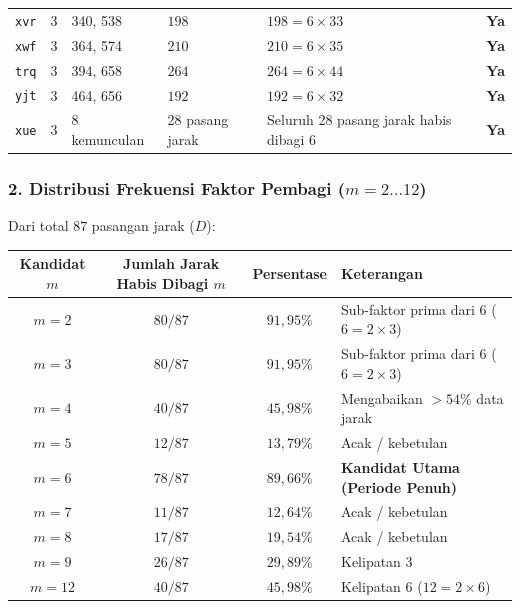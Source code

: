 \documentclass[11pt,a4paper]{article}
\begin{document}
\begin{table}[h!]
{\begin{tabular}{l c l l l c}
\texttt{xvr}   & 3 & 340, 538      & $198$          & $198 = 6 \times 33$                              & \textbf{Ya} \\
\texttt{xwf}   & 3 & 364, 574      & $210$          & $210 = 6 \times 35$                              & \textbf{Ya} \\
\texttt{trq}   & 3 & 394, 658      & $264$          & $264 = 6 \times 44$                              & \textbf{Ya} \\
\texttt{yjt}   & 3 & 464, 656      & $192$          & $192 = 6 \times 32$                              & \textbf{Ya} \\
\texttt{xue}   & 3 & 8 kemunculan  & 28 pasang jarak& Seluruh 28 pasang jarak habis dibagi 6           & \textbf{Ya} \\
\bottomrule
\end{tabular}
}
\end{table}

\subsubsection*{2. Distribusi Frekuensi Faktor Pembagi ($m = 2 \dots 12$)}
Dari total $87$ pasangan jarak ($D$):
\begin{center}
\small
\begin{tabular}{c c c l}
\toprule
\textbf{Kandidat $m$} & \textbf{Jumlah Jarak Habis Dibagi $m$} & \textbf{Persentase} & \textbf{Keterangan} \\
\midrule
$m = 2$  & $80 / 87$ & $91{,}95\%$ & Sub-faktor prima dari 6 ($6 = 2 \times 3$) \\
$m = 3$  & $80 / 87$ & $91{,}95\%$ & Sub-faktor prima dari 6 ($6 = 2 \times 3$) \\
$m = 4$  & $40 / 87$ & $45{,}98\%$ & Mengabaikan $>54\%$ data jarak \\
$m = 5$  & $12 / 87$ & $13{,}79\%$ & Acak / kebetulan \\
\textbf{$m = 6$} & \textbf{$78 / 87$} & \textbf{$89{,}66\%$} & \textbf{Kandidat Utama (Periode Penuh)} \\
$m = 7$  & $11 / 87$ & $12{,}64\%$ & Acak / kebetulan \\
$m = 8$  & $17 / 87$ & $19{,}54\%$ & Acak / kebetulan \\
$m = 9$  & $26 / 87$ & $29{,}89\%$ & Kelipatan 3 \\
$m = 12$ & $40 / 87$ & $45{,}98\%$ & Kelipatan 6 ($12 = 2 \times 6$) \\
\bottomrule
\end{tabular}
\end{center}
\end{document}
